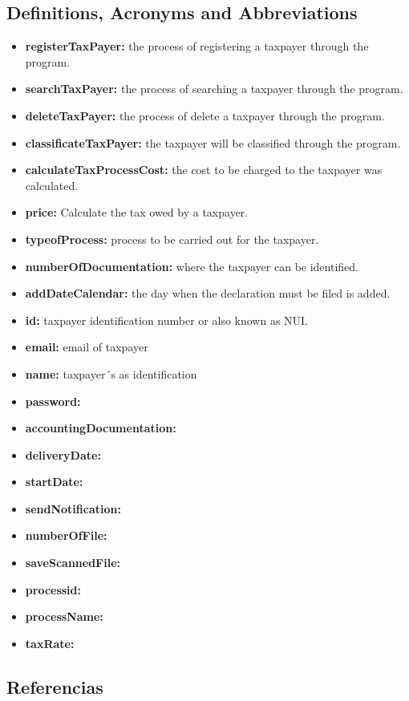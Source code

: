 \documentclass[12pt,a4paper, twosite]{article}
\begin{document}
\subsection{Definitions, Acronyms and Abbreviations}
\label{sec:orgb158e36}
\begin{itemize}
    \item \textbf{registerTaxPayer:} the process of registering a taxpayer through the program.
    \item \textbf{searchTaxPayer:} the process of searching a taxpayer through the program.
    \item \textbf{deleteTaxPayer:} the process of delete a taxpayer through the program.
    \item \textbf{classificateTaxPayer:} the taxpayer will be classified through the program.
    \item \textbf{calculateTaxProcessCost:} the cost to be charged to the taxpayer was calculated.
    \item \textbf{price:} Calculate the tax owed by a taxpayer.
    \item \textbf{typeofProcess:} process to be carried out for the taxpayer.
    \item \textbf{numberOfDocumentation:} where the taxpayer can be identified.
    \item \textbf{addDateCalendar:} the day when the declaration must be filed is added.
    \item \textbf{id:} taxpayer identification number or also known as NUI.
    \item \textbf{email:} email of taxpayer
    \item \textbf{name:} taxpayer´s as identification
    \item \textbf{password:}
    \item \textbf{accountingDocumentation:}
    \item \textbf{deliveryDate:}
    \item \textbf{startDate:}
    \item \textbf{sendNotification:}
    \item \textbf{numberOfFile:}
    \item \textbf{saveScannedFile:}
    \item \textbf{processid:}
    \item \textbf{processName:}
    \item \textbf{taxRate:}
\end{itemize}



\subsection{Referencias}
\label{sec:org62711e0}
\end{document}
